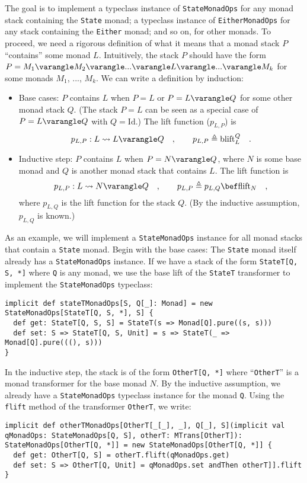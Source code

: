 The goal is to implement a typeclass instance of \lstinline!StateMonadOps!
for any monad stack containing the \lstinline!State! monad; a typeclass
instance of \lstinline!EitherMonadOps! for any stack containing the
\lstinline!Either! monad; and so on, for other monads. To proceed,
we need a rigorous definition of what it means that a monad stack
$P$ \textsf{``}contains\textsf{''} some monad $L$. Intuitively, the stack $P$ should
have the form $P=M_{1}\varangle M_{2}\varangle...\varangle L\varangle...\varangle M_{k}$
for some monads $M_{1}$, ..., $M_{k}$. We can write a definition
by induction: 
\begin{itemize}
\item Base cases: $P$ contains $L$ when $P=L$ or $P=L\varangle Q$ for
some other monad stack $Q$. (The stack $P=L$ can be seen as a special
case of $P=L\varangle Q$ with $Q=\text{Id}$.) The lift function
($p_{L,P}$) is
\[
p_{L,P}:L\leadsto L\varangle Q\quad,\quad\quad p_{L,P}\triangleq\text{blift}_{L}^{Q}\quad.
\]
\item Inductive step: $P$ contains $L$ when $P=N\varangle Q$, where $N$
is some base monad and $Q$ is another monad stack that contains $L$.
The lift function is
\[
p_{L,P}:L\leadsto N\varangle Q\quad,\quad\quad p_{L,P}\triangleq p_{L,Q}\bef\text{flift}_{N}\quad,
\]
where $p_{L,Q}$ is the lift function for the stack $Q$. (By the
inductive assumption, $p_{L,Q}$ is known.)
\end{itemize}
As an example, we will implement a \lstinline!StateMonadOps! instance
for all monad stacks that contain a \lstinline!State! monad. Begin
with the base cases: The \lstinline!State! monad itself already has
a \lstinline!StateMonadOps! instance. If we have a stack of the form
\lstinline!StateT[Q, S, *]! where \lstinline!Q! is any monad, we
use the base lift of the \lstinline!StateT! transformer to implement
the \lstinline!StateMonadOps! typeclass:
\begin{lstlisting}
implicit def stateTMonadOps[S, Q[_]: Monad] = new StateMonadOps[StateT[Q, S, *], S] {
  def get: StateT[Q, S, S] = StateT(s => Monad[Q].pure((s, s)))
  def set: S => StateT[Q, S, Unit] = s => StateT(_ => Monad[Q].pure(((), s)))
}
\end{lstlisting}

In the inductive step, the stack is of the form \lstinline!OtherT[Q, *]!
where \textsf{``}\lstinline!OtherT!\textsf{''} is a monad transformer for the base
monad $N$. By the inductive assumption, we already have a \lstinline!StateMonadOps!
typeclass instance for the monad \lstinline!Q!. Using the \lstinline!flift!
method of the transformer \lstinline!OtherT!, we write:
\begin{lstlisting}
implicit def otherTMonadOps[OtherT[_[_], _], Q[_], S](implicit val qMonadOps: StateMonadOps[Q, S], otherT: MTrans[OtherT]): StateMonadOps[OtherT[Q, *]] = new StateMonadOps[OtherT[Q, *]] {
  def get: OtherT[Q, S] = otherT.flift(qMonadOps.get)
  def set: S => OtherT[Q, Unit] = qMonadOps.set andThen otherT]].flift
}
\end{lstlisting}

